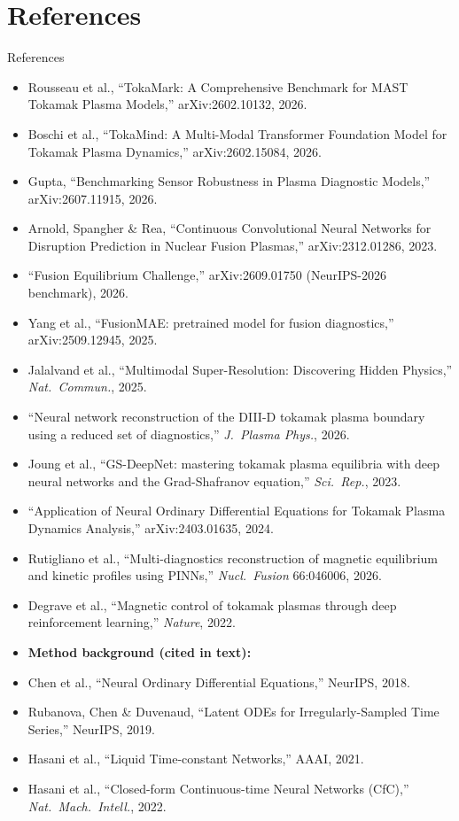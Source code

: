 \documentclass[aspectratio=169]{beamer}
\begin{document}
\section{References}
\begin{frame}[allowframebreaks]{References}
  \tiny
  \begin{itemize}
    \item Rousseau et al., ``TokaMark: A Comprehensive Benchmark for MAST Tokamak Plasma Models,'' arXiv:2602.10132, 2026.
    \item Boschi et al., ``TokaMind: A Multi-Modal Transformer Foundation Model for Tokamak Plasma Dynamics,'' arXiv:2602.15084, 2026.
    \item Gupta, ``Benchmarking Sensor Robustness in Plasma Diagnostic Models,'' arXiv:2607.11915, 2026.
    \item Arnold, Spangher \& Rea, ``Continuous Convolutional Neural Networks for Disruption Prediction in Nuclear Fusion Plasmas,'' arXiv:2312.01286, 2023.
    \item ``Fusion Equilibrium Challenge,'' arXiv:2609.01750 (NeurIPS-2026 benchmark), 2026.
    \item Yang et al., ``FusionMAE: pretrained model for fusion diagnostics,'' arXiv:2509.12945, 2025.
    \item Jalalvand et al., ``Multimodal Super-Resolution: Discovering Hidden Physics,'' \textit{Nat.\ Commun.}, 2025.
    \item ``Neural network reconstruction of the DIII-D tokamak plasma boundary using a reduced set of diagnostics,'' \textit{J.\ Plasma Phys.}, 2026.
    \item Joung et al., ``GS-DeepNet: mastering tokamak plasma equilibria with deep neural networks and the Grad-Shafranov equation,'' \textit{Sci.\ Rep.}, 2023.
    \item ``Application of Neural Ordinary Differential Equations for Tokamak Plasma Dynamics Analysis,'' arXiv:2403.01635, 2024.
    \item Rutigliano et al., ``Multi-diagnostics reconstruction of magnetic equilibrium and kinetic profiles using PINNs,'' \textit{Nucl.\ Fusion} 66:046006, 2026.
    \item Degrave et al., ``Magnetic control of tokamak plasmas through deep reinforcement learning,'' \textit{Nature}, 2022.
    \framebreak
    \item[] \textbf{Method background (cited in text):}
    \item Chen et al., ``Neural Ordinary Differential Equations,'' NeurIPS, 2018.
    \item Rubanova, Chen \& Duvenaud, ``Latent ODEs for Irregularly-Sampled Time Series,'' NeurIPS, 2019.
    \item Hasani et al., ``Liquid Time-constant Networks,'' AAAI, 2021.
    \item Hasani et al., ``Closed-form Continuous-time Neural Networks (CfC),'' \textit{Nat.\ Mach.\ Intell.}, 2022.
  \end{itemize}
\end{frame}
\end{document}
